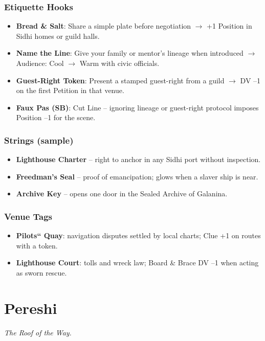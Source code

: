 \documentclass[12pt,oneside]{book}
\begin{document}
\subsection*{Etiquette Hooks}
\begin{itemize}
  \item \textbf{Bread \& Salt}: Share a simple plate before negotiation $\rightarrow$ +1 Position in Sidhi homes or guild halls.
  \item \textbf{Name the Line}: Give your family or mentor's lineage when introduced $\rightarrow$ Audience: Cool $\rightarrow$ Warm with civic officials.
  \item \textbf{Guest-Right Token}: Present a stamped guest-right from a guild $\rightarrow$ DV --1 on the first Petition in that venue.
  \item \textbf{Faux Pas (SB)}: Cut Line -- ignoring lineage or guest-right protocol imposes Position --1 for the scene.
\end{itemize}

\subsection*{Strings (sample)}
\begin{itemize}
  \item \textbf{Lighthouse Charter} -- right to anchor in any Sidhi port without inspection.
  \item \textbf{Freedman's Seal} -- proof of emancipation; glows when a slaver ship is near.
  \item \textbf{Archive Key} -- opens one door in the Sealed Archive of Galanina.
\end{itemize}

\subsection*{Venue Tags}
\begin{itemize}
  \item \textbf{Pilots`` Quay}: navigation disputes settled by local charts; Clue +1 on routes with a token.
  \item \textbf{Lighthouse Court}: tolls and wreck law; Board & Brace DV --1 when acting as sworn rescue.
\end{itemize}

\newpage

\newpage

\chapter{Pereshi}
\emph{The Roof of the Way.}
\end{document}
